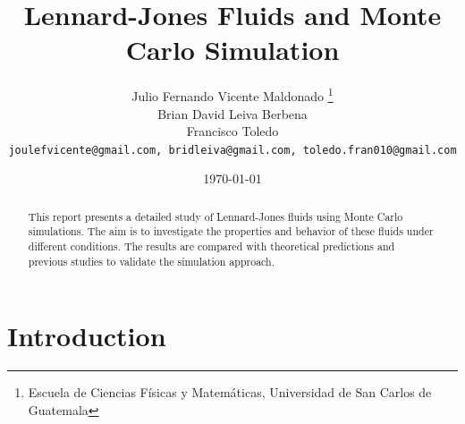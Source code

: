 \documentclass[a4paper,12pt]{article}
\title{Lennard-Jones Fluids and Monte Carlo Simulation}
\author{
    Julio Fernando Vicente Maldonado \thanks{Escuela de Ciencias Físicas y Matemáticas, Universidad de San Carlos de Guatemala} \\
     Brian David Leiva Berbena\footnotemark[1] \\
    Francisco Toledo\footnotemark[1] \\
    \texttt{joulefvicente@gmail.com, bridleiva@gmail.com, toledo.fran010@gmail.com}
}
\date{\today}
\begin{document}
\maketitle

\begin{abstract}
This report presents a detailed study of Lennard-Jones fluids using Monte Carlo simulations. The aim is to investigate the properties and behavior of these fluids under different conditions. The results are compared with theoretical predictions and previous studies to validate the simulation approach.
\end{abstract}

\section{Introduction}
\end{document}
